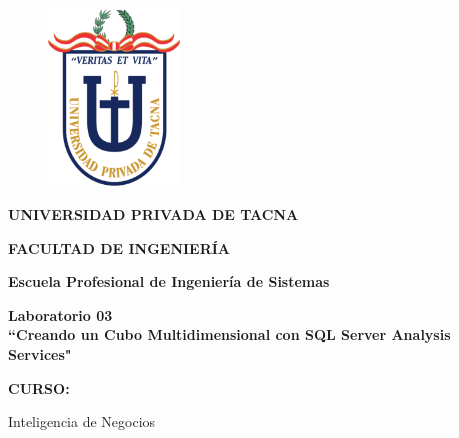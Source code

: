 \documentclass[12pt,letterpaper]{article}
\begin{document}
\begin{titlepage}
    \begin{center}
        \begin{figure}[htb]
            \begin{center}
                \includegraphics[width=3.5cm]{./img/logo}
            \end{center}
        \end{figure}
        \vspace*{0.15in}
        \begin{Large}
            \textbf{UNIVERSIDAD PRIVADA DE TACNA}\\
        \end{Large}
        \vspace*{0.15in}
        \begin{Large}
            \textbf{FACULTAD DE INGENIERÍA} \\
        \end{Large}
        \vspace*{0.1in}
        \begin{Large}
            \textbf{Escuela Profesional de Ingeniería de Sistemas} \\
        \end{Large}
        \vspace*{0.3in}
        \begin{Large}
            \textbf{Laboratorio 03}\\
            \textbf{``Creando un Cubo Multidimensional con SQL Server Analysis Services"}\\
        \end{Large}
        \vspace*{0.2in}
        \begin{Large}
            \textbf{CURSO:} \\
        \end{Large}
        \vspace*{0.1in}
        \begin{large}
            Inteligencia de Negocios\\

\end{large}
\end{center}
\end{titlepage}
\end{document}
